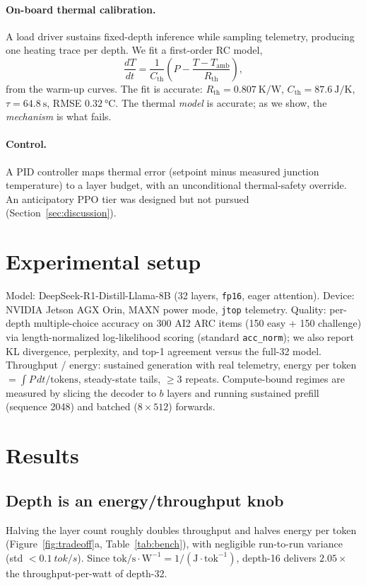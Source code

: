 \documentclass[11pt]{article}
\begin{document}
\paragraph{On-board thermal calibration.} A load driver sustains fixed-depth inference while
sampling telemetry, producing one heating trace per depth. We fit a first-order RC model,
\begin{equation}
\frac{dT}{dt} = \frac{1}{C_{\text{th}}}\!\left(P - \frac{T - T_{\text{amb}}}{R_{\text{th}}}\right),
\end{equation}
from the warm-up curves. The fit is accurate: $R_{\text{th}}=\SI{0.807}{\kelvin\per\watt}$,
$C_{\text{th}}=\SI{87.6}{\joule\per\kelvin}$, $\tau=\SI{64.8}{\second}$, RMSE
$\SI{0.32}{\celsius}$. The thermal \emph{model} is accurate; as we show, the \emph{mechanism} is
what fails.

\paragraph{Control.} A PID controller maps thermal error (setpoint minus measured junction
temperature) to a layer budget, with an unconditional thermal-safety override. An anticipatory
PPO tier was designed but not pursued (Section~\ref{sec:discussion}).

\section{Experimental setup}
Model: DeepSeek-R1-Distill-Llama-8B (32 layers, \texttt{fp16}, eager attention). Device: NVIDIA
Jetson AGX Orin, MAXN power mode, \texttt{jtop} telemetry. Quality: per-depth multiple-choice
accuracy on 300 AI2 ARC items (150 easy + 150 challenge) via length-normalized log-likelihood
scoring (standard \texttt{acc\_norm}); we also report KL divergence, perplexity, and top-1
agreement versus the full-32 model. Throughput / energy: sustained generation with real
telemetry, energy per token $=\int P\,dt / \text{tokens}$, steady-state tails,
$\geq 3$ repeats. Compute-bound regimes are measured by slicing the decoder to $b$ layers and
running sustained prefill (sequence 2048) and batched (\(8\times512\)) forwards.

\section{Results}

\subsection{Depth is an energy/throughput knob}
Halving the layer count roughly doubles throughput and halves energy per token
(Figure~\ref{fig:tradeoff}a, Table~\ref{tab:bench}), with negligible run-to-run variance
(std $<\SI{0.1}{tok/s}$). Since $\text{tok/s}\cdot\text{W}^{-1} = 1/(\text{J}\cdot\text{tok}^{-1})$,
depth-16 delivers $2.05\times$ the throughput-per-watt of depth-32.
\end{document}
